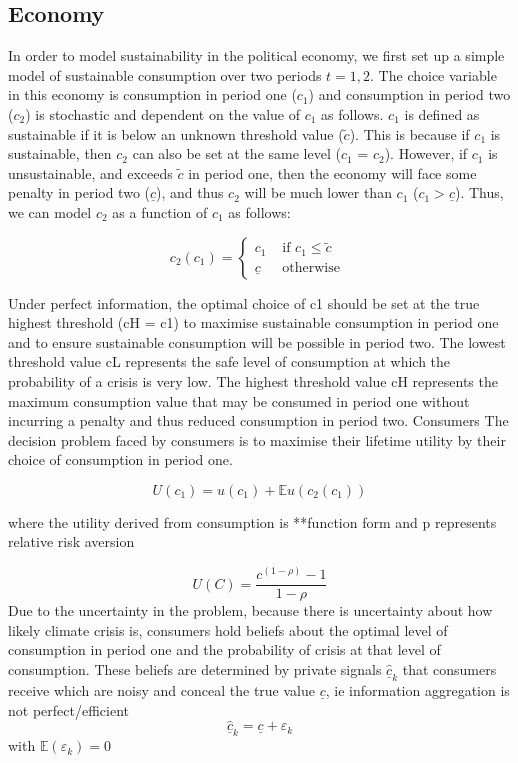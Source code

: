\documentclass[11pt,preprint, authoryear]{elsarticle}
\numberwithin{equation}{section}
\numberwithin{figure}{section}
\numberwithin{table}{section}
\begin{document}
\hypertarget{economy}{%
\subsection{Economy}\label{economy}}

In order to model sustainability in the political economy, we first set
up a simple model of sustainable consumption over two periods
\(t = 1, 2\). The choice variable in this economy is consumption in
period one (\(c_1\)) and consumption in period two (\(c_2\)) is
stochastic and dependent on the value of \(c_1\) as follows. \(c_1\) is
defined as sustainable if it is below an unknown threshold value
(\(\tilde{c}\)). This is because if \(c_1\) is sustainable, then \(c_2\)
can also be set at the same level (\(c_1\) = \(c_2\)). However, if
\(c_1\) is unsustainable, and exceeds \(\tilde{c}\) in period one, then
the economy will face some penalty in period two (\(\underline{c}\)),
and thus \(c_2\) will be much lower than \(c_1\)
(\(c_1> \underline{c}\)). Thus, we can model \(c_2\) as a function of
\(c_1\) as follows:

\[
c_2\left(c_1\right)= \begin{cases}c_1 & \text { if } c_1 \leq \tilde{c} \\ \underline{c} & \text { otherwise }\end{cases}
\]

Under perfect information, the optimal choice of c1 should be set at the
true highest threshold (cH = c1) to maximise sustainable consumption in
period one and to ensure sustainable consumption will be possible in
period two. The lowest threshold value cL represents the safe level of
consumption at which the probability of a crisis is very low. The
highest threshold value cH represents the maximum consumption value that
may be consumed in period one without incurring a penalty and thus
reduced consumption in period two. Consumers The decision problem faced
by consumers is to maximise their lifetime utility by their choice of
consumption in period one.

\[
U\left(c_1\right)=u\left(c_1\right)+\mathbb{E} u\left(c_2\left(c_1\right)\right)
\]

where the utility derived from consumption is **function form and p
represents relative risk aversion

\[
U(C)=\frac{c^(1-\rho)-1}{1-\rho}
\] Due to the uncertainty in the problem, because there is uncertainty
about how likely climate crisis is, consumers hold beliefs about the
optimal level of consumption in period one and the probability of crisis
at that level of consumption. These beliefs are determined by private
signals \(\hat{\underline{c}}_k\) that consumers receive which are noisy
and conceal the true value \(\underline{c}\), ie information aggregation
is not perfect/efficient \[
\hat{\underline{c}}_k=\underline{c}+\varepsilon_k
\] with \(\mathbb{E}\left(\varepsilon_k\right)=0\)
\end{document}
